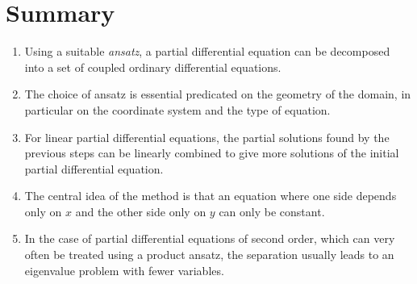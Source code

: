\section{Summary}
\begin{enumerate}
\item
Using a suitable {\em ansatz}, a partial differential equation can be
decomposed into a set of coupled ordinary differential equations.
\item
The choice of ansatz is essential predicated on the geometry of the
domain, in particular on the coordinate system and the type of equation.
\item
For linear partial differential equations, the partial solutions found
by the previous steps can be linearly combined to give more solutions
of the initial partial differential equation.
\item
The central idea of the method is that an equation where one side
depends only on $x$ and the other side only on $y$ can only be constant.
\item
In the case of partial differential equations of second order,
which can very often be treated using a product ansatz, the separation
usually leads to an eigenvalue problem with fewer variables.
\end{enumerate}



